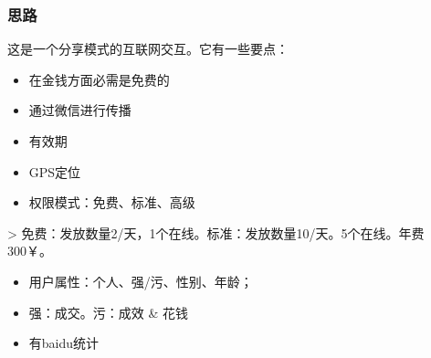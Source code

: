 \documentclass[11pt]{article}
\begin{document}
\subsubsection{思路}
\label{sec:org25e9631}
这是一个分享模式的互联网交互。它有一些要点：
\begin{itemize}
\item 在金钱方面必需是免费的
\item 通过微信进行传播
\item 有效期
\item GPS定位
\item 权限模式：免费、标准、高级
\end{itemize}
> 免费：发放数量2/天，1个在线。标准：发放数量10/天。5个在线。年费300￥。
\begin{itemize}
\item 用户属性：个人、强/污、性别、年龄；
\item 强：成交。污：成效 \& 花钱
\item 有baidu统计
\end{itemize}
\end{document}
